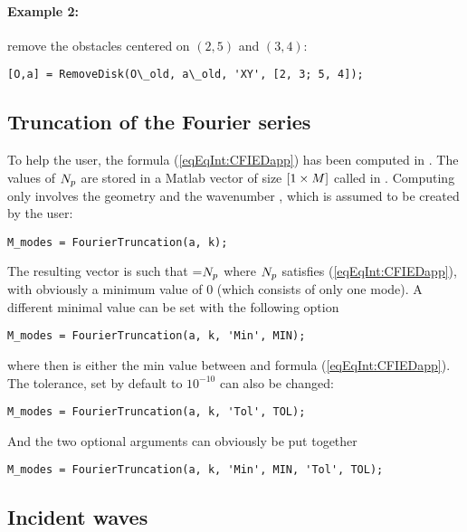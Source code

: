 \paragraph{Example 2:} remove the obstacles centered on $(2,5)$ and $(3,4)$:
\begin{verbatim}
[O,a] = RemoveDisk(O\_old, a\_old, 'XY', [2, 3; 5, 4]);
\end{verbatim}

\subsection{Truncation of the Fourier series}

To help the user, the formula (\ref{eqEqInt:CFIEDapp}) has been computed in \mudiff. The values of $N_{p}$ are stored in a Matlab vector of size $[1\times M]$ called  in \mudiff. Computing  only involves the geometry and the wavenumber , which is assumed to be created by the user:
\begin{verbatim}
M_modes = FourierTruncation(a, k);
\end{verbatim}
The resulting vector is such that =$N_{p}$ where $N_{p}$ satisfies (\ref{eqEqInt:CFIEDapp}), with obviously a minimum value of $0$ (which consists of only one mode). A different minimal value can be set with the following option
\begin{verbatim}
M_modes = FourierTruncation(a, k, 'Min', MIN);
\end{verbatim}
where then  is either the min value between  and formula (\ref{eqEqInt:CFIEDapp}). The tolerance, set by default to $10^{-10}$ can also be changed:
\begin{verbatim}
M_modes = FourierTruncation(a, k, 'Tol', TOL);
\end{verbatim}
And the two optional arguments can obviously be put together
\begin{verbatim}
M_modes = FourierTruncation(a, k, 'Min', MIN, 'Tol', TOL);
\end{verbatim}

\subsection{Incident waves}

\subsubsection{}

